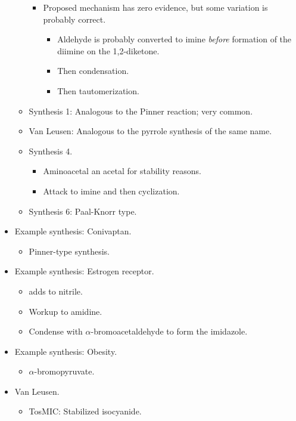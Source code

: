 \documentclass[../notes.tex]{subfiles}
\begin{document}
\begin{itemize}
\begin{itemize}
\begin{itemize}
            \item Proposed mechanism has zero evidence, but some variation is probably correct.
            \begin{itemize}
                \item Aldehyde is probably converted to imine \emph{before} formation of the diimine on the 1,2-diketone.
                \item Then condensation.
                \item Then tautomerization.
            \end{itemize}
        \end{itemize}
        \item Synthesis 1: Analogous to the Pinner reaction; very common.
        \item Van Leusen: Analogous to the pyrrole synthesis of the same name.
        \item Synthesis 4.
        \begin{itemize}
            \item Aminoacetal an acetal for stability reasons.
            \item Attack to imine and then cyclization.
        \end{itemize}
        \item Synthesis 6: Paal-Knorr type.
    \end{itemize}
    \item Example synthesis: Conivaptan.
    \begin{itemize}
        \item Pinner-type synthesis.
    \end{itemize}
    \item Example synthesis: Estrogen receptor.
    \begin{itemize}
        \item {} adds to nitrile.
        \item Workup to amidine.
        \item Condense with $\alpha$-bromoacetaldehyde to form the imidazole.
    \end{itemize}
    \item Example synthesis: Obesity.
    \begin{itemize}
        \item $\alpha$-bromopyruvate.
    \end{itemize}
    \item Van Leusen.
    \begin{itemize}
        \item TosMIC: Stabilized isocyanide.

\end{itemize}
\end{itemize}
\end{document}
